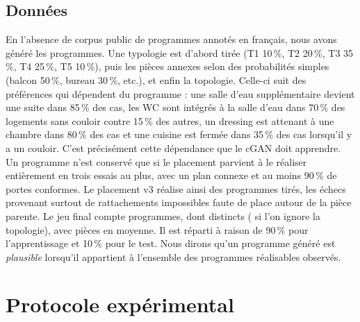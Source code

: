 \documentclass[twocolumn]{ICCKjournal}
\begin{document}
\subsection{Données}

En l'absence de corpus public de programmes annotés en français, nous
avons généré les programmes. Une typologie est d'abord tirée (T1 10\,\%,
T2 20\,\%, T3 35\,\%, T4 25\,\%, T5 10\,\%), puis les pièces annexes selon
des probabilités simples (balcon 50\,\%, bureau 30\,\%, etc.), et enfin
la topologie. Celle-ci suit des préférences qui dépendent du programme :
une salle d'eau supplémentaire devient une suite dans 85\,\% des cas, les
WC sont intégrés à la salle d'eau dans 70\,\% des logements sans couloir
contre 15\,\% des autres, un dressing est attenant à une chambre dans
80\,\% des cas et une cuisine est fermée dans 35\,\% des cas lorsqu'il y a
un couloir. C'est précisément cette dépendance que le cGAN doit
apprendre. Un programme n'est conservé que si le placement parvient à le
réaliser entièrement en trois essais au plus, avec un plan connexe et au
moins 90\,\% de portes conformes. Le placement v3 réalise ainsi
\resDsAcceptance{} des programmes tirés, les échecs provenant surtout de
rattachements impossibles faute de place autour de la pièce parente. Le
jeu final compte \resDsN{} programmes, dont \resDsUnique{} distincts
(\resDsUniquePieces{} si l'on ignore la topologie), avec
\resDsMeanRooms{} pièces en moyenne. Il est réparti à raison de 90\,\%
pour l'apprentissage et 10\,\% pour le test. Nous dirons qu'un programme
généré est \emph{plausible} lorsqu'il appartient à l'ensemble des
programmes réalisables observés.


\section{Protocole expérimental}
\end{document}
